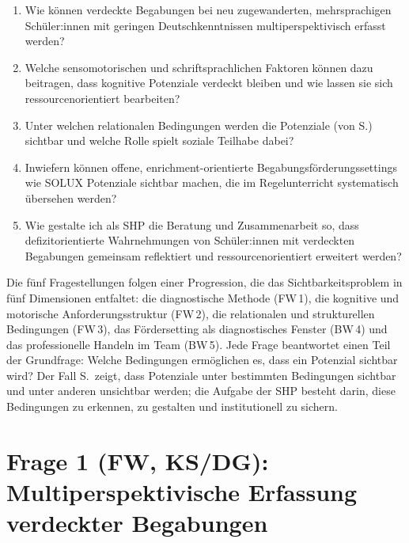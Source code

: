 \documentclass[ngerman, a4paper]{article}
\begin{document}
\begin{enumerate}
  \item[\textbf{FW\,1}] Wie können verdeckte Begabungen bei neu zugewanderten,
        mehrsprachigen Schüler:innen mit geringen Deutschkenntnissen multiperspektivisch
        erfasst werden?
  \item[\textbf{FW\,2}] Welche sensomotorischen und schriftsprachlichen
        Faktoren können dazu beitragen, dass kognitive Potenziale verdeckt bleiben
        und wie lassen sie sich
        ressourcenorientiert bearbeiten?
  \item[\textbf{FW\,3}] Unter welchen relationalen Bedingungen werden
        die Potenziale (von S.) sichtbar und welche Rolle spielt soziale
        Teilhabe dabei?
  \item[\textbf{BW\,4}] Inwiefern können offene, enrichment-orientierte
        Begabungsförderungssettings wie SOLUX Potenziale sichtbar machen, die
        im Regelunterricht systematisch übersehen werden?
  \item[\textbf{BW\,5}] Wie gestalte ich als SHP die Beratung und Zusammenarbeit so,
        dass defizitorientierte
        Wahrnehmungen von Schüler:innen mit verdeckten Begabungen gemeinsam reflektiert
        und ressourcenorientiert erweitert werden?
\end{enumerate}

Die fünf Fragestellungen folgen einer Progression, die das Sichtbarkeitsproblem
in fünf Dimensionen entfaltet: die diagnostische Methode (FW\,1), die
kognitive und motorische Anforderungsstruktur (FW\,2), die relationalen und
strukturellen Bedingungen (FW\,3), das Fördersetting als diagnostisches
Fenster (BW\,4) und das professionelle Handeln im Team (BW\,5). Jede Frage
beantwortet einen Teil der Grundfrage: Welche Bedingungen ermöglichen es, dass
ein Potenzial sichtbar wird? Der Fall S.\ zeigt, dass Potenziale unter
bestimmten Bedingungen sichtbar und unter anderen unsichtbar werden; die
Aufgabe der SHP besteht darin, diese Bedingungen zu erkennen, zu gestalten
und institutionell zu sichern.

\newpage

\section{Frage 1 (FW, KS/DG): Multiperspektivische Erfassung verdeckter Begabungen}
\label{sec:frage1}
\end{document}
